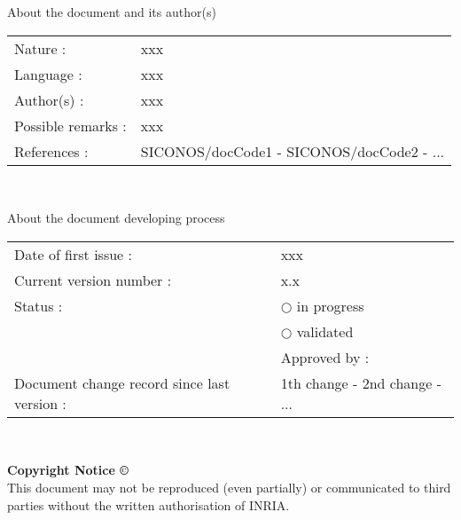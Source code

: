 \begin{center}
  \textsf{\Large About the document and its author(s)}
\end{center}

\noindent\begin{tabular}{|p{}|p{}|}
\hline
Nature :& \textsf{xxx}\\
Language :& \textsf{xxx}\\
Author(s) :& \textsf{xxx}\\
Possible remarks :& \textsf{xxx}\\
References : &\textsf{SICONOS/docCode1 - SICONOS/docCode2 - ...}\\
\hline
\end{tabular}

\textsf{ }\\



\begin{center}
  \textsf{\Large About the document developing process}
\end{center}
\begin{tabular}{|p{}|p{}|}
\hline
Date of first issue : &\textsf{xxx}\\
Current version number : &\textsf{x.x}\\ 
Status :&$\bigcirc$ in progress\\
\textit{ }&$\bigcirc$ validated\\
\textit{ }& \hspace{0.5cm} Approved by :\\
\hline
Document change record since last version : &\textsf{1th change - 2nd change - ...} \\
\hline
\end{tabular}


\textsf{ }\\
\begin{center}
\textbf{Copyright Notice \copyright}\\
This document may not be reproduced (even partially) or communicated to third parties without the written authorisation of INRIA.
\end{center}


%

